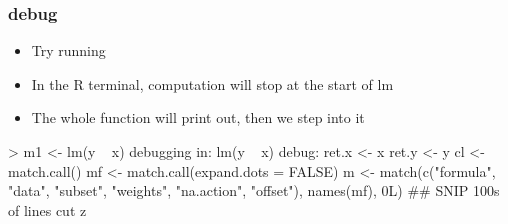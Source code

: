\documentclass[10pt,english]{beamer}
\begin{document}
\begin{frame}
  \frametitle{debug}

  \begin{itemize}
  \item Try running
  \end{itemize}

 \begin{itemize}
  \item In the R terminal, computation will stop at the start of lm
  \item The whole function will print out, then we step into it
  \end{itemize}
  

\begin{Schunk}
  \begin{Soutput}
> m1 <- lm(y ~ x)
debugging in: lm(y ~ x)
debug: {
    ret.x <- x
    ret.y <- y
    cl <- match.call()
    mf <- match.call(expand.dots = FALSE)
    m <- match(c("formula", "data", "subset", "weights", "na.action",
        "offset"), names(mf), 0L)
    ## SNIP 100s of lines cut
    z
}

  \end{Soutput}
\end{Schunk}
\end{frame}
\end{document}
